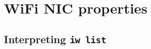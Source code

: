 \documentclass[../wifi-security.tex]{subfiles}
\begin{document}
\chapter{WiFi NIC properties}

\section*{Interpreting \texttt{iw list}}
\end{document}
